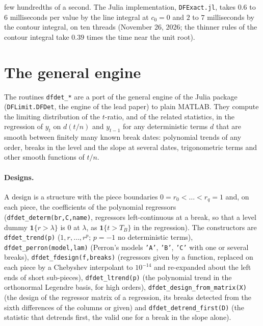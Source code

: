 \documentclass[11pt]{article}
\newcommand{\code}[1]{\texttt{#1}}
\begin{document}
few hundredths of a second.  The Julia implementation, \code{DFExact.jl}, takes $0.6$ to $6$ milliseconds per value by the line integral at $c_0=0$ and $2$ to $7$ milliseconds by the contour integral, on ten threads (November 26, 2026; the thinner rules of the contour integral take $0.39$ times the time near the unit root).

\section{The general engine}
\label{sec:general}

The routines \code{dfdet\_*} are a port of the general engine of the Julia package (\code{DFLimit.DFDet}, the engine of the lead paper) to plain MATLAB.  They compute the limiting distribution of the $t$-ratio, and of the related statistics, in the regression of $y_t$ on $d(t/n)$ and $y_{t-1}$ for any deterministic terms $d$ that are smooth between finitely many known break dates: polynomial trends of any order, breaks in the level and the slope at several dates, trigonometric terms and other smooth functions of $t/n$.

\paragraph{Designs.}  A design is a structure with the piece boundaries $0=r_0<\dots<r_q=1$ and, on each piece, the coefficients of the polynomial regressors (\code{dfdet\_determ(br,C,name)}, regressors left-continuous at a break, so that a level dummy $\mathbf 1\{r>\lambda\}$ is $0$ at $\lambda$, as $\mathbf 1\{t>T_B\}$ in the regression).  The constructors are \code{dfdet\_trend(p)} ($1,r,\dots,r^p$; $p=-1$ no deterministic terms), \code{dfdet\_perron(model,lam)} (Perron's models \code{'A'}, \code{'B'}, \code{'C'} with one or several breaks), \code{dfdet\_fdesign(f,breaks)} (regressors given by a function, replaced on each piece by a Chebyshev interpolant to $10^{-14}$ and re-expanded about the left ends of short sub-pieces), \code{dfdet\_ltrend(p)} (the polynomial trend in the orthonormal Legendre basis, for high orders), \code{dfdet\_design\_from\_matrix(X)} (the design of the regressor matrix of a regression, its breaks detected from the sixth differences of the columns or given) and \code{dfdet\_detrend\_first(D)} (the statistic that detrends first, the valid one for a break in the slope alone).
\end{document}
